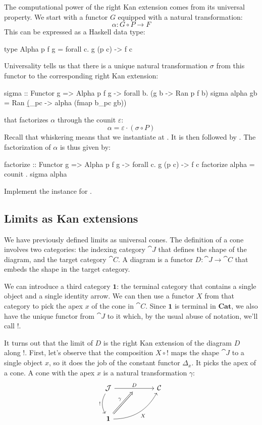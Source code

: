 \documentclass[DaoFP]{subfiles}
\begin{document}
The computational power of the right Kan extension comes from its universal property. We start with a functor $G$ equipped with a natural transformation: 
\[ \alpha \colon G \circ P \to F \]
This can be expressed as a Haskell data type:
\begin{haskell}
type Alpha p f g = forall c. g (p c) -> f c
\end{haskell}
Universality tells us that there is a unique natural transformation $\sigma$ from this functor to the corresponding right Kan extension:
\begin{haskell}
sigma :: Functor g => Alpha p f g -> forall b. (g b -> Ran p f b)
sigma alpha gb = Ran (\b_pc -> alpha (fmap b_pc gb))
\end{haskell}
that factorizes $\alpha$ through the counit $\varepsilon$:
\[ \alpha = \varepsilon \cdot (\sigma \circ P) \]
Recall that whiskering means that we instantiate  at . It is then followed by . The factorization of $\alpha$ is thus given by:
\begin{haskell}
factorize :: Functor g => Alpha p f g -> forall c. g (p c) -> f c
factorize alpha = counit . sigma alpha
\end{haskell}

\begin{exercise}
Implement the  instance for .
\end{exercise}

\subsection{Limits as Kan extensions}
 We have previously defined limits as universal cones. The definition of a cone involves two categories: the indexing category $\cat J$ that defines the shape of the diagram, and the target category $\cat C$. A diagram is a functor $D \colon \cat J \to \cat C$ that embeds the shape in the target category. 
 
 We can introduce a third category $\mathbf 1$: the terminal category that contains a single object and a single identity arrow. We can then use a functor $X$ from that category to pick the apex $x$ of the cone in $\cat C$. Since $\mathbf 1$ is terminal in $\mathbf{Cat}$, we also have the unique functor from $\cat J$ to it which, by the usual abuse of notation, we'll call $!$.
 
It turns out that the limit of $D$ is the right Kan extension of the diagram $D$ along $!$. First, let's observe that the composition $X \circ !$ maps the shape $\cat J$ to a single object $x$, so it does the job of the constant functor $\Delta_x$. It picks the apex of a cone. A cone with the apex $x$ is a natural transformation $\gamma$: 
\[
 \begin{tikzcd} [row sep=1cm, column sep=1cm]
 \cat J
 \arrow[rr, "D", "" {name=ID, below} ]
 \arrow[d, bend right, "!"']
 && \cat C
 \\
 \mathbf 1
  \arrow[urr, bend right, "X"']
 \arrow[Rightarrow, "\gamma",  to=ID]
 \end{tikzcd}
\]
\end{document}
